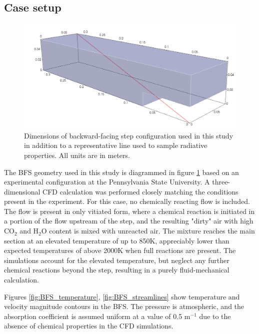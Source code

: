 \subsection{Case setup}
\begin{figure}
\includegraphics[width=\linewidth]{figures/ch4/BFS_visual.png}
\caption{Dimensions of backward-facing step configuration used in this study in addition to a representative line used to sample radiative properties. All units are in meters. }
\label{fig:BFS_geometry}
\end{figure}

The BFS geometry used in this study is diagrammed in figure \ref{fig:BFS_geometry} based on an experimental configuration at the Pennsylvania State University.
A three-dimensional CFD calculation was performed closely matching the conditions present in the experiment. For this case, no chemically reacting flow is included. 
The flow is present in only vitiated form, where a chemical reaction is initiated in a portion of the flow upstream of the step, and the resulting "dirty" air with high CO$_2$ and H$_2$O content is mixed with unreacted air. 
The mixture reaches the main section at an elevated temperature of up to 850K, appreciably lower than expected temperatures of above 2000K when full reactions are present. 
The simulations account for the elevated temperature, but neglect any further chemical reactions beyond the step, resulting in a purely fluid-mechanical calculation.

Figures \ref{fig:BFS_temperature}, \ref{fig:BFS_streamlines} show temperature and velocity magnitude contours in the BFS. The pressure is atmospheric, and the absorption coefficient is assumed uniform at a value of 0.5 m$^{-1}$ due to the absence of chemical properties in the CFD simulations.

